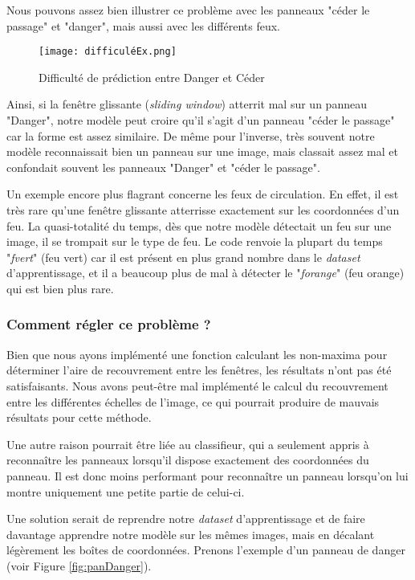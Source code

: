 \documentclass[twocolumn,10pt]{article}
\begin{document}
    Nous pouvons assez bien illustrer ce problème avec les panneaux "céder le passage" et "danger", mais aussi avec les différents feux.
    \begin{figure}
        \centering
        \texttt{[image: difficuléEx.png]}
        \caption{Difficulté de prédiction entre Danger et Céder}
        \label{fig:difficulte-prediction}
    \end{figure}
    Ainsi, si la fenêtre glissante (\textit{sliding window}) atterrit mal sur un panneau "Danger", notre modèle peut croire qu'il s'agit d'un panneau "céder le passage" car la forme est assez similaire. De même pour l'inverse, très souvent notre modèle reconnaissait bien un panneau sur une image, mais classait assez mal et confondait souvent les panneaux "Danger" et "céder le passage".

    Un exemple encore plus flagrant concerne les feux de circulation. En effet, il est très rare qu'une fenêtre glissante atterrisse exactement sur les coordonnées d'un feu. La quasi-totalité du temps, dès que notre modèle détectait un feu sur une image, il se trompait sur le type de feu. Le code renvoie la plupart du temps "\textit{fvert}" (feu vert) car il est présent en plus grand nombre dans le \textit{dataset} d'apprentissage, et il a beaucoup plus de mal à détecter le "\textit{forange}" (feu orange) qui est bien plus rare.


    \subsubsection{Comment régler ce problème ?}

    Bien que nous ayons implémenté une fonction calculant les non-maxima pour déterminer l'aire de recouvrement entre les fenêtres, les résultats n'ont pas été satisfaisants. Nous avons peut-être mal implémenté le calcul du recouvrement entre les différentes échelles de l'image, ce qui pourrait produire de mauvais résultats pour cette méthode.

    Une autre raison pourrait être liée au classifieur, qui a seulement appris à reconnaître les panneaux lorsqu'il dispose exactement des coordonnées du panneau. Il est donc moins performant pour reconnaître un panneau lorsqu'on lui montre uniquement une petite partie de celui-ci.

    Une solution serait de reprendre notre \textit{dataset} d'apprentissage et de faire davantage apprendre notre modèle sur les mêmes images, mais en décalant légèrement les boîtes de coordonnées. Prenons l'exemple d'un panneau de danger (voir Figure \ref{fig:panDanger}).
\end{document}
